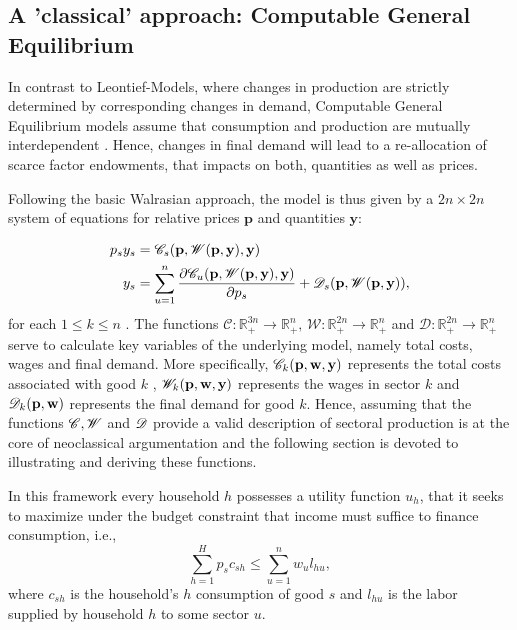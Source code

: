 
\subsection{A 'classical' approach: Computable General Equilibrium} \label{subsec:CGE}

In contrast to Leontief-Models, where changes in production are strictly determined by corresponding changes in demand, Computable General Equilibrium models assume that consumption and production are mutually interdependent \citep[see][for a general introduction]{cardeneteAppliedGeneralEquilibrium2017}.
Hence, changes in final demand will lead to a re-allocation of scarce factor endowments, that impacts on both, quantities as well as prices.

Following the basic Walrasian approach, the model is thus given by a $2n \times 2n$ system of equations for relative prices $\mathbf{p}$ and quantities $\mathbf{y}$: 

\begin{align}
\label{eq:equilibrium}
  p_s y_s &= \mathscr{C}_s (\mathbf{p},\mathscr{W}(\mathbf{p},\mathbf{y}), \mathbf{y}) \\
 y_s &=  \sum_{u=1}^n \frac{\partial \mathscr{C}_u (\mathbf{p},\mathscr{W}(\mathbf{p},\mathbf{y}),\mathbf{y})}{\partial p_s} + \mathscr{D}_s(\mathbf{p},\mathscr W(\mathbf{p},\mathbf{y})),
\end{align}
for each $1 \leq  k \leq n$ .
The functions $\mathscr{C} \colon \mathbb R^{3n}_+ \to \mathbb R^n_+,\, \mathscr{W}: \mathbb R^{2n}_+ \to \mathbb R^n_+$ and $\mathscr{D}: \mathbb R^{2n}_+ \to \mathbb R^n_+$ serve to calculate key variables of the underlying model, namely total costs, wages and final demand. More specifically, $\mathscr{C}_k(\mathbf{p},\mathbf{w},\mathbf{y})$ represents the total costs associated with good $k$ ,
$\mathscr{W}_k(\mathbf{p},\mathbf{w},\mathbf{y})$ represents the wages in sector $k$
and $\mathscr{D}_k(\mathbf{p},\mathbf{w})$ represents the final demand for good $k$. Hence, assuming that the functions $\mathscr{C}, \mathscr{W}$ and $\mathscr{D}$ provide a valid description of sectoral production is at the core of neoclassical argumentation and the following section is devoted to illustrating and deriving these functions.

In this framework every household $h$ possesses a utility function $u_h$, that it seeks to maximize under the budget constraint that income must suffice to finance consumption, i.e.,
\begin{equation}
  \sum_{h = 1}^H p_s c_{sh} \leq \sum_{u=1}^n w_{u} l_{hu},
\end{equation}
where $c_{sh}$ is the household's $h$ consumption of good $s$ and $l_{hu}$ is the labor supplied by household $h$ to some sector $u$.

